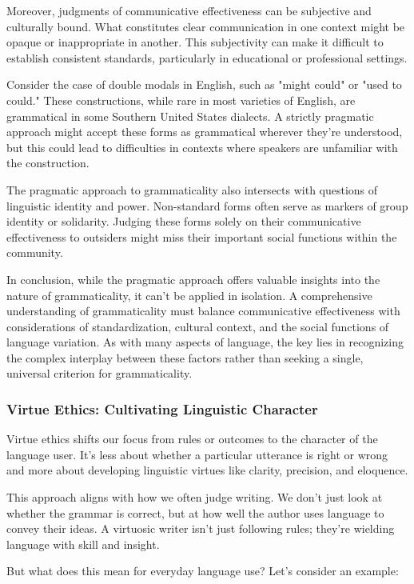 Moreover, judgments of communicative effectiveness can be subjective and culturally bound. What constitutes clear communication in one context might be opaque or inappropriate in another. This subjectivity can make it difficult to establish consistent standards, particularly in educational or professional settings.

Consider the case of double modals in English, such as "might could" or "used to could." These constructions, while rare in most varieties of English, are grammatical in some Southern United States dialects. A strictly pragmatic approach might accept these forms as grammatical wherever they're understood, but this could lead to difficulties in contexts where speakers are unfamiliar with the construction.

The pragmatic approach to grammaticality also intersects with questions of linguistic identity and power. Non-standard forms often serve as markers of group identity or solidarity. Judging these forms solely on their communicative effectiveness to outsiders might miss their important social functions within the community.

In conclusion, while the pragmatic approach offers valuable insights into the nature of grammaticality, it can't be applied in isolation. A comprehensive understanding of grammaticality must balance communicative effectiveness with considerations of standardization, cultural context, and the social functions of language variation. As with many aspects of language, the key lies in recognizing the complex interplay between these factors rather than seeking a single, universal criterion for grammaticality.

\subsubsection{Virtue Ethics: Cultivating Linguistic Character}

Virtue ethics shifts our focus from rules or outcomes to the character of the language user. It's less about whether a particular utterance is right or wrong and more about developing linguistic virtues like clarity, precision, and eloquence.

This approach aligns with how we often judge writing. We don't just look at whether the grammar is correct, but at how well the author uses language to convey their ideas. A virtuosic writer isn't just following rules; they're wielding language with skill and insight.

But what does this mean for everyday language use? Let's consider an example:

